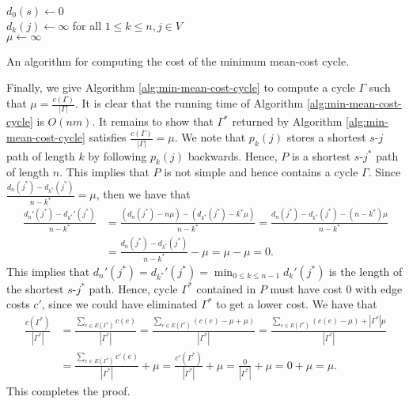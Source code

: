 \documentclass[letterpaper,reqno,12pt]{article}
\begin{document}
\begin{exercise}
  \begin{algorithm}
    $d_0(s) \leftarrow 0$ \\
    $d_k(j) \leftarrow \infty$ for all $1 \leq k \leq n, j \in V$ \\
    $\mu \leftarrow \infty$ \\
    \caption{An algorithm for computing the cost of the minimum mean-cost cycle.}
    \label{alg:min-mean-cost-cycle-value}
  \end{algorithm}

  Finally, we give Algorithm \ref{alg:min-mean-cost-cycle} to compute a cycle $\Gamma$ such that $\mu = \frac{c(\Gamma)}{|\Gamma|}$. It is clear that the running time of Algorithm \ref{alg:min-mean-cost-cycle} is $O(nm)$. It remains to show that $\Gamma^*$ returned by Algorithm \ref{alg:min-mean-cost-cycle} satisfies $\frac{c(\Gamma)}{|\Gamma|} = \mu$. We note that $p_k(j)$ stores a shortest $s$-$j$ path of length $k$ by following $p_k(j)$ backwards. Hence, $P$ is a shortest $s$-$j^*$ path of length $n$. This implies that $P$ is not simple and hence contains a cycle $\Gamma$. Since $\frac{d_n(j^*) - d_{k^*}(j^*)}{n - k^*} = \mu$, then we have that
  \begin{align*}
    \frac{d_n'\left(j^*\right) - d_{k^*}'\left(j^*\right)}{n - k^*} &= \frac{\left(d_n\left(j^*\right) - n\mu\right)- \left(d_{k^*}\left(j^*\right) - k^* \mu\right)}{n - k^*} = \frac{d_n\left(j^*\right) - d_{k^*}\left(j^*\right) - \left(n - k^*\right) \mu}{n - k^*} \\
    &= \frac{d_n\left(j^*\right) - d_{k^*}\left(j^*\right)}{n - k^*} - \mu = \mu - \mu = 0.
  \end{align*}
  This implies that $d_n'(j^*) = d_{k^*}'(j^*) = \min_{0 \leq k \leq n - 1} d_k'(j^*)$ is the length of the shortest $s$-$j^*$ path. Hence, cycle $\Gamma^*$ contained in $P$ must have cost $0$ with edge costs $c'$, since we could have eliminated $\Gamma^*$ to get a lower cost. We have that
  \begin{align*}
    \frac{c\left(\Gamma^*\right)}{\left|\Gamma^*\right|} &= \frac{\sum_{e \in E\left(\Gamma^*\right)} c(e)}{\left|\Gamma^*\right|} = \frac{\sum_{e \in E\left(\Gamma^*\right)} (c(e) - \mu + \mu)}{\left|\Gamma^*\right|} = \frac{\sum_{e \in E\left(\Gamma^*\right)} (c(e) - \mu) + \left|\Gamma^*\right| \mu}{\left|\Gamma^*\right|} \\
    &= \frac{\sum_{e \in E\left(\Gamma^*\right)} c'(e)}{\left|\Gamma^*\right|} + \mu = \frac{c'\left(\Gamma^*\right)}{\left|\Gamma^*\right|} + \mu = \frac{0}{\left|\Gamma^*\right|} + \mu = 0 + \mu = \mu.
  \end{align*}
  This completes the proof.


\end{exercise}
\end{document}
